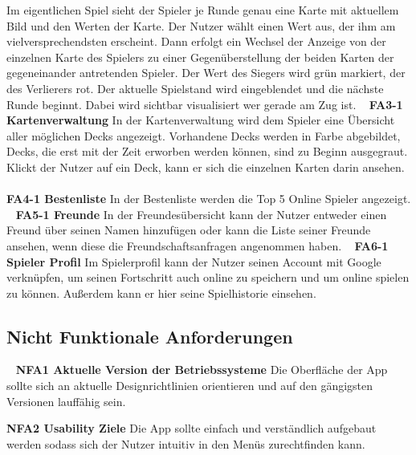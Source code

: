 \documentclass{scrartcl}
\begin{document}
Im eigentlichen Spiel sieht der Spieler je Runde genau eine Karte mit aktuellem Bild und den Werten der Karte. Der Nutzer wählt einen Wert aus, der ihm am vielversprechendsten erscheint.
Dann erfolgt ein Wechsel der Anzeige von der einzelnen Karte des Spielers zu einer Gegenüberstellung der beiden Karten der gegeneinander antretenden Spieler. Der Wert des Siegers wird grün markiert, der des Verlierers rot. 
Der aktuelle Spielstand wird eingeblendet und die nächste Runde beginnt.
Dabei wird sichtbar visualisiert wer gerade am Zug ist.
\ \newline
\textbf{FA3-1 Kartenverwaltung} \newline
In der Kartenverwaltung wird dem Spieler eine Übersicht aller möglichen Decks angezeigt. Vorhandene Decks werden in Farbe abgebildet, Decks, die erst mit der Zeit erworben werden können, sind zu Beginn ausgegraut.
Klickt der Nutzer auf ein Deck, kann er sich die einzelnen Karten darin ansehen.
\ \newline\\
\textbf{FA4-1 Bestenliste} \newline
In der Bestenliste werden die Top 5 Online Spieler angezeigt.
\ \newline
\textbf{FA5-1 Freunde} \newline
In der Freundesübersicht kann der Nutzer entweder einen Freund über seinen Namen hinzufügen oder kann die Liste seiner Freunde ansehen, wenn diese die Freundschaftsanfragen angenommen haben.
\ \newline
\textbf{FA6-1 Spieler Profil} \newline
Im Spielerprofil kann der Nutzer seinen Account mit Google verknüpfen, um seinen Fortschritt auch online zu speichern und um online spielen zu können.
Außerdem kann er hier seine Spielhistorie einsehen.
\ \newline

\subsection{Nicht Funktionale Anforderungen}
\ \newline
\textbf{NFA1 Aktuelle Version der Betriebssysteme} \newline
Die Oberfläche der App sollte sich an aktuelle Designrichtlinien orientieren und auf den gängigsten Versionen lauffähig sein.
\ \newline

\textbf{NFA2 Usability Ziele} \newline
Die App sollte einfach und verständlich aufgebaut werden sodass sich der Nutzer intuitiv in den Menüs zurechtfinden kann.
\ \newline
\end{document}
